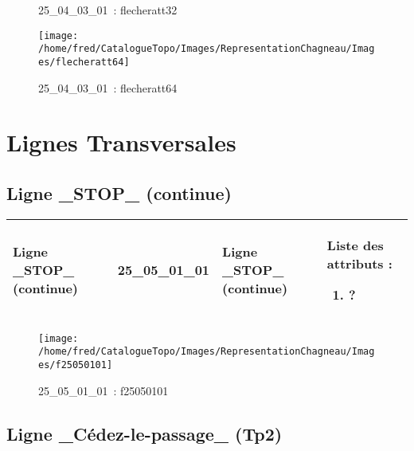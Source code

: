 \documentclass[12pt,titlepage]{book}
\begin{document}
\begin{figure}[h!]
\begin{minipage}[t]{3cm}
\begin{center}
      \caption[~25\_04\_03\_01]{\small{25\_04\_03\_01~:} \tiny{flecheratt32}}\label{flecheratt32}
    \end{center}
  \end{minipage}
  \begin{minipage}[t]{3cm}
    \begin{center}
      \texttt{[image: /home/fred/CatalogueTopo/Images/RepresentationChagneau/Images/flecheratt64]}
      \caption[~25\_04\_03\_01]{\small{25\_04\_03\_01~:} \tiny{flecheratt64}}\label{flecheratt64}
    \end{center}
  \end{minipage}
\end{figure}

\section{\large Lignes Transversales}
\subsection{Ligne \_STOP\_ (continue)}
\noindent
\vspace{\baselineskip}

\renewcommand{\arraystretch}{1.2}
\begin{supertabular}{|p{10cm}|c|p{13cm}|p{12cm}|}
 Ligne \_STOP\_ (continue) & 25\_05\_01\_01 & Ligne \_STOP\_ (continue) & Liste des attributs :
\begin{enumerate}
  \item ?\end{enumerate}
\\
\hline
\end{supertabular}
\begin{figure}[h!]
  \hfill         %
  \begin{minipage}[t]{3cm}
    \begin{center}
      \texttt{[image: /home/fred/CatalogueTopo/Images/RepresentationChagneau/Images/f25050101]}
      \caption[~25\_05\_01\_01]{\small{25\_05\_01\_01~:} \tiny{f25050101}}\label{f25050101}
    \end{center}
  \end{minipage}
\end{figure}


\subsection{Ligne \_Cédez-le-passage\_ (Tp2)}
\noindent
\vspace{\baselineskip}
\end{document}
